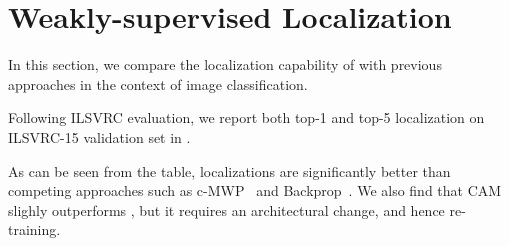 \section{Weakly-supervised Localization}\label{sec:sup_localization}
In this section, we compare the localization capability of \gcam{} with previous approaches in the context of image classification.

Following ILSVRC evaluation, we report both top-1 and top-5 localization  on ILSVRC-15 validation set in . 

As can be seen from the table, \gcam{} localizations are significantly better than competing approaches such as c-MWP~\cite{zhang2016top} and Backprop~\cite{simonyan_arxiv13}. We also find that CAM slighly outperforms \gcam{}, but it requires an architectural change, and hence re-training.

\vspace{-10pt}
\begin{table}[h!]
\centering
    \vspace{-6pt}
    \caption{Classification and Localization results on ILSVRC-15 val.
    \gcam{} outperforms~\cite{simonyan_arxiv13} and c-MWP \cite{zhang2016top} by a significant margin.} 
    \label{table:locres}
    \vspace{-10pt}
\end{table}

